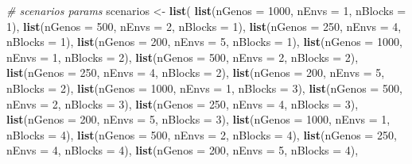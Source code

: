 \documentclass[
]{article}
\newenvironment{Shaded}{\begin{snugshade}}{\end{snugshade}}
\newcommand{\AttributeTok}[1]{\textcolor[rgb]{0.13,0.29,0.53}{#1}}
\newcommand{\CommentTok}[1]{\textcolor[rgb]{0.56,0.35,0.01}{\textit{#1}}}
\newcommand{\DecValTok}[1]{\textcolor[rgb]{0.00,0.00,0.81}{#1}}
\newcommand{\FunctionTok}[1]{\textcolor[rgb]{0.13,0.29,0.53}{\textbf{#1}}}
\newcommand{\NormalTok}[1]{#1}
\newcommand{\OtherTok}[1]{\textcolor[rgb]{0.56,0.35,0.01}{#1}}
\begin{document}
\begin{Shaded}
\begin{Highlighting}[]
\CommentTok{\# scenarios params}
\NormalTok{scenarios }\OtherTok{\textless{}{-}} \FunctionTok{list}\NormalTok{(}
  \FunctionTok{list}\NormalTok{(}\AttributeTok{nGenos =} \DecValTok{1000}\NormalTok{, }\AttributeTok{nEnvs =} \DecValTok{1}\NormalTok{, }\AttributeTok{nBlocks =} \DecValTok{1}\NormalTok{),}
  \FunctionTok{list}\NormalTok{(}\AttributeTok{nGenos =} \DecValTok{500}\NormalTok{, }\AttributeTok{nEnvs =} \DecValTok{2}\NormalTok{, }\AttributeTok{nBlocks =} \DecValTok{1}\NormalTok{),}
  \FunctionTok{list}\NormalTok{(}\AttributeTok{nGenos =} \DecValTok{250}\NormalTok{, }\AttributeTok{nEnvs =} \DecValTok{4}\NormalTok{, }\AttributeTok{nBlocks =} \DecValTok{1}\NormalTok{),}
  \FunctionTok{list}\NormalTok{(}\AttributeTok{nGenos =} \DecValTok{200}\NormalTok{, }\AttributeTok{nEnvs =} \DecValTok{5}\NormalTok{, }\AttributeTok{nBlocks =} \DecValTok{1}\NormalTok{),}
  \FunctionTok{list}\NormalTok{(}\AttributeTok{nGenos =} \DecValTok{1000}\NormalTok{, }\AttributeTok{nEnvs =} \DecValTok{1}\NormalTok{, }\AttributeTok{nBlocks =} \DecValTok{2}\NormalTok{),}
  \FunctionTok{list}\NormalTok{(}\AttributeTok{nGenos =} \DecValTok{500}\NormalTok{, }\AttributeTok{nEnvs =} \DecValTok{2}\NormalTok{, }\AttributeTok{nBlocks =} \DecValTok{2}\NormalTok{),}
  \FunctionTok{list}\NormalTok{(}\AttributeTok{nGenos =} \DecValTok{250}\NormalTok{, }\AttributeTok{nEnvs =} \DecValTok{4}\NormalTok{, }\AttributeTok{nBlocks =} \DecValTok{2}\NormalTok{),}
  \FunctionTok{list}\NormalTok{(}\AttributeTok{nGenos =} \DecValTok{200}\NormalTok{, }\AttributeTok{nEnvs =} \DecValTok{5}\NormalTok{, }\AttributeTok{nBlocks =} \DecValTok{2}\NormalTok{),}
  \FunctionTok{list}\NormalTok{(}\AttributeTok{nGenos =} \DecValTok{1000}\NormalTok{, }\AttributeTok{nEnvs =} \DecValTok{1}\NormalTok{, }\AttributeTok{nBlocks =} \DecValTok{3}\NormalTok{),}
  \FunctionTok{list}\NormalTok{(}\AttributeTok{nGenos =} \DecValTok{500}\NormalTok{, }\AttributeTok{nEnvs =} \DecValTok{2}\NormalTok{, }\AttributeTok{nBlocks =} \DecValTok{3}\NormalTok{),}
  \FunctionTok{list}\NormalTok{(}\AttributeTok{nGenos =} \DecValTok{250}\NormalTok{, }\AttributeTok{nEnvs =} \DecValTok{4}\NormalTok{, }\AttributeTok{nBlocks =} \DecValTok{3}\NormalTok{),}
  \FunctionTok{list}\NormalTok{(}\AttributeTok{nGenos =} \DecValTok{200}\NormalTok{, }\AttributeTok{nEnvs =} \DecValTok{5}\NormalTok{, }\AttributeTok{nBlocks =} \DecValTok{3}\NormalTok{),}
  \FunctionTok{list}\NormalTok{(}\AttributeTok{nGenos =} \DecValTok{1000}\NormalTok{, }\AttributeTok{nEnvs =} \DecValTok{1}\NormalTok{, }\AttributeTok{nBlocks =} \DecValTok{4}\NormalTok{),}
  \FunctionTok{list}\NormalTok{(}\AttributeTok{nGenos =} \DecValTok{500}\NormalTok{, }\AttributeTok{nEnvs =} \DecValTok{2}\NormalTok{, }\AttributeTok{nBlocks =} \DecValTok{4}\NormalTok{),}
  \FunctionTok{list}\NormalTok{(}\AttributeTok{nGenos =} \DecValTok{250}\NormalTok{, }\AttributeTok{nEnvs =} \DecValTok{4}\NormalTok{, }\AttributeTok{nBlocks =} \DecValTok{4}\NormalTok{),}
  \FunctionTok{list}\NormalTok{(}\AttributeTok{nGenos =} \DecValTok{200}\NormalTok{, }\AttributeTok{nEnvs =} \DecValTok{5}\NormalTok{, }\AttributeTok{nBlocks =} \DecValTok{4}\NormalTok{),}
  

\end{Highlighting}
\end{Shaded}
\end{document}
